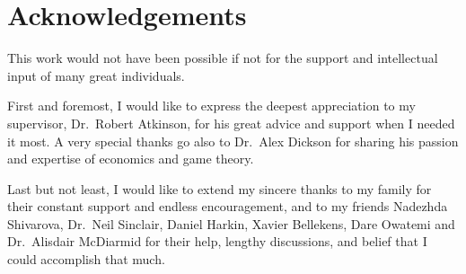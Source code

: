\chapter*{Acknowledgements} %
\label{cha:acknowledgements}
\mtcaddchapter[Acknowledgements]

This work would not have been possible if not for the support and intellectual input of many great individuals.

First and foremost, I would like to express the deepest appreciation to my supervisor, Dr.~Robert Atkinson, for his great advice and support when I needed it most. A very special thanks go also to Dr.~Alex Dickson for sharing his passion and expertise of economics and game theory.

Last but not least, I would like to extend my sincere thanks to my family for their constant support and endless encouragement, and to my friends Nadezhda Shivarova, Dr.~Neil Sinclair, Daniel Harkin, Xavier Bellekens, Dare Owatemi and Dr.~Alisdair McDiarmid for their help, lengthy discussions, and belief that I could accomplish that much.

